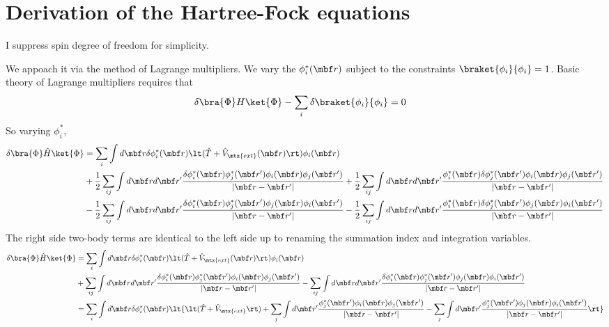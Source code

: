 \documentclass[10pt]{article}
\begin{document}
\section{\label{sec:hfeq} Derivation of the Hartree-Fock equations}
  I suppress spin degree of freedom for simplicity.

  We appoach it via the method of Lagrange multipliers. We vary the $\phi_i^*(\mbf
  r)$ subject to the constraints $\braket{\phi_i}{\phi_i} = 1$. Basic theory of
  Lagrange multipliers requires that
  \begin{align*}
    \delta \bra{\Phi} H \ket{\Phi} - \sum_i \delta \braket{\phi_i}{\phi_i}
    &=
    0
  \end{align*}
  So varying $\phi^*_i$,
  \begin{align*}
    \delta \bra{\Phi} \hat H \ket{\Phi}
    &=
    \sum_i \int d\mbf r
    \delta \phi_i^*(\mbf r)
    \lt(\hat T + \hat V_\mtx{ext}(\mbf r)\rt)
    \phi_i(\mbf r)
    \\
    &+
    \frac 12 \sum_{ij} \int d\mbf r d\mbf r'
    \frac{\delta \phi_i^*(\mbf r) \phi_j^*(\mbf r') \phi_i(\mbf r) \phi_j(\mbf r')}
    {|\mbf r - \mbf r'|}
    +
    \frac 12 \sum_{ij} \int d\mbf r d\mbf r'
    \frac{\phi_i^*(\mbf r) \delta \phi_j^*(\mbf r') \phi_i(\mbf r) \phi_j(\mbf r')}
    {|\mbf r - \mbf r'|}
    \\
    &-
    \frac 12 \sum_{ij} \int d\mbf r d\mbf r'
    \frac{\delta \phi_i^*(\mbf r) \phi_j^*(\mbf r') \phi_j(\mbf r) \phi_i(\mbf r')}
    {|\mbf r - \mbf r'|}
    -
    \frac 12 \sum_{ij} \int d\mbf r d\mbf r'
    \frac{\phi_i^*(\mbf r) \delta \phi_j^*(\mbf r') \phi_j(\mbf r) \phi_i(\mbf r')}
    {|\mbf r - \mbf r'|}
  \end{align*}
  The right side two-body terms are identical to the left side up to renaming the
  summation index and integration variables.
  \begin{align*}
    \delta \bra{\Phi} \hat H \ket{\Phi}
    &=
    \sum_i \int d\mbf r
    \delta \phi_i^*(\mbf r)
    \lt(\hat T + \hat V_\mtx{ext}(\mbf r)\rt)
    \phi_i(\mbf r)
    \\
    &+
    \sum_{ij} \int d\mbf r d\mbf r'
    \frac{\delta \phi_i^*(\mbf r) \phi_j^*(\mbf r') \phi_i(\mbf r) \phi_j(\mbf r')}
    {|\mbf r - \mbf r'|}
    -
    \sum_{ij} \int d\mbf r d\mbf r'
    \frac{\delta \phi_i^*(\mbf r) \phi_j^*(\mbf r') \phi_j(\mbf r) \phi_i(\mbf r')}
    {|\mbf r - \mbf r'|}
    \\
    &=
    \sum_i \int d\mbf r \delta \phi_i^*(\mbf r) \lt\{
      \lt(\hat T + \hat V_\mtx{ext} \rt)
      + \sum_j \int d\mbf r' 
      \frac{\phi_j^*(\mbf r') \phi_i(\mbf r) \phi_j(\mbf r')}
      {|\mbf r - \mbf r'|}
      - \sum_j \int d\mbf r' 
      \frac{\phi_j^*(\mbf r') \phi_j(\mbf r) \phi_i(\mbf r')}
      {|\mbf r - \mbf r'|}
    \rt\}
  \end{align*}
\end{document}
